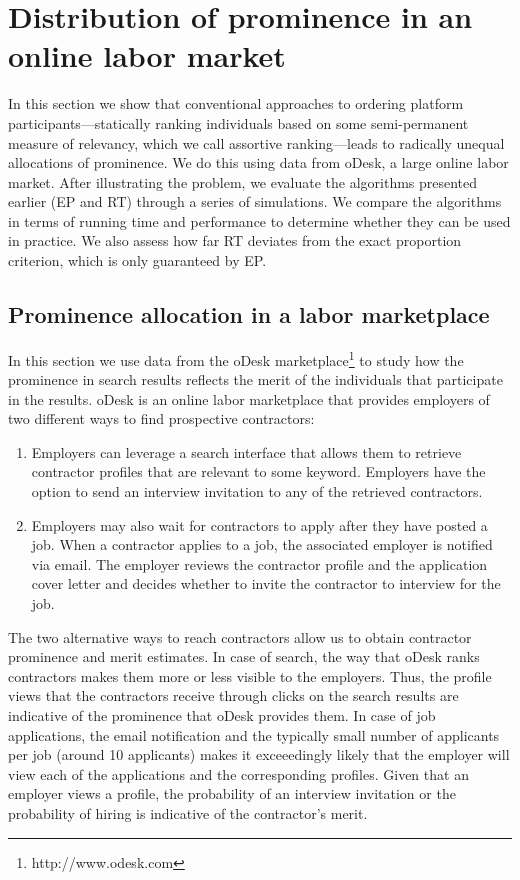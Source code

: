 \section{Distribution of prominence in an online labor market}
\label{sec:expr}

In this section we show that conventional approaches to ordering
platform participants---statically ranking individuals based on some
semi-permanent measure of relevancy, which we call assortive
ranking---leads to radically unequal allocations of prominence. We do
this using data from oDesk, a large online labor market. After
illustrating the problem, we evaluate the algorithms presented earlier
(EP and RT) through a series of simulations. We compare the algorithms
in terms of running time and performance to determine whether they can
be used in practice. We also assess how far RT deviates from the
exact proportion criterion, which is only guaranteed by EP.

\subsection{Prominence allocation in a labor marketplace}
\label{sec:expr-odesk}

In this section we use data from the oDesk
marketplace\footnote{http://www.odesk.com} to study how the prominence
in search results reflects the merit of the individuals that
participate in the results. oDesk is an online labor marketplace that
provides employers of two different ways to find prospective
contractors:
\begin{enumerate}
\item Employers can leverage a search interface that allows them to
  retrieve contractor profiles that are relevant to some
  keyword. Employers have the option to send an interview invitation
  to any of the retrieved contractors.
\item Employers may also wait for contractors to apply after they have
  posted a job. When a contractor applies to a job, the associated
  employer is notified via email. The employer reviews the contractor
  profile and the application cover letter and decides whether to
  invite the contractor to interview for the job.
\end{enumerate}

The two alternative ways to reach contractors allow us to obtain
contractor prominence and merit estimates. In case of search, the way
that oDesk ranks contractors makes them more or less visible to the
employers. Thus, the profile views that the contractors receive
through clicks on the search results are indicative of the prominence
that oDesk provides them. In case of job applications, the email
notification and the typically small number of applicants per job
(around 10 applicants) makes it exceeedingly likely that the employer
will view each of the applications and the corresponding
profiles. Given that an employer views a profile, the probability of
an interview invitation or the probability of hiring is indicative of
the contractor's merit.


